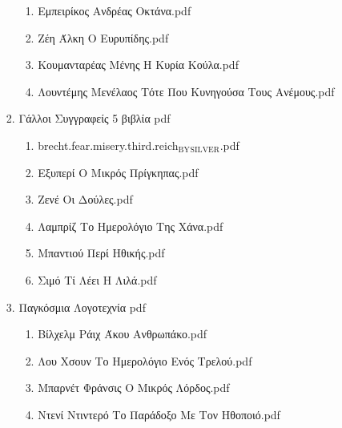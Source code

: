 \documentclass[11pt]{article}
\begin{document}
\begin{enumerate}
\begin{enumerate}
\begin{enumerate}
\begin{enumerate}
\item Εμπειρίκος Ανδρέας Οκτάνα.pdf
\label{sec-1-1-1-1-49-2-2-1-85-4-2}

\item Ζέη Άλκη Ο Ευρυπίδης.pdf
\label{sec-1-1-1-1-49-2-2-1-85-4-3}

\item Κουμανταρέας Μένης Η Κυρία Κούλα.pdf
\label{sec-1-1-1-1-49-2-2-1-85-4-4}

\item Λουντέμης Μενέλαος Τότε Που Κυνηγούσα Τους Ανέμους.pdf
\label{sec-1-1-1-1-49-2-2-1-85-4-5}
\end{enumerate}

\item Γάλλοι Συγγραφείς 5 βιβλία pdf
\label{sec-1-1-1-1-49-2-2-1-85-5}
\begin{enumerate}
\item brecht.fear.misery.third.reich$_{\text{BY}}$$_{\text{SILVER}}$.pdf
\label{sec-1-1-1-1-49-2-2-1-85-5-1}

\item Εξυπερί Ο Μικρός Πρίγκηπας.pdf
\label{sec-1-1-1-1-49-2-2-1-85-5-2}

\item Ζενέ Οι Δούλες.pdf
\label{sec-1-1-1-1-49-2-2-1-85-5-3}

\item Λαμπρίζ Το Ημερολόγιο Της Χάνα.pdf
\label{sec-1-1-1-1-49-2-2-1-85-5-4}

\item Μπαντιού Περί Hθικής.pdf
\label{sec-1-1-1-1-49-2-2-1-85-5-5}

\item Σιμό Τί Λέει Η Λιλά.pdf
\label{sec-1-1-1-1-49-2-2-1-85-5-6}
\end{enumerate}

\item Παγκόσμια Λογοτεχνία pdf
\label{sec-1-1-1-1-49-2-2-1-85-6}
\begin{enumerate}
\item Βίλχελμ Ράιχ Άκου Ανθρωπάκο.pdf
\label{sec-1-1-1-1-49-2-2-1-85-6-1}

\item Λου Χσουν Το Ημερολόγιο Ενός Τρελού.pdf
\label{sec-1-1-1-1-49-2-2-1-85-6-2}

\item Μπαρνέτ Φράνσις Ο Μικρός Λόρδος.pdf
\label{sec-1-1-1-1-49-2-2-1-85-6-3}

\item Ντενί Ντιντερό Το Παράδοξο Με Τον Ηθοποιό.pdf
\label{sec-1-1-1-1-49-2-2-1-85-6-4}


\end{enumerate}
\end{enumerate}
\end{enumerate}
\end{enumerate}
\end{document}
